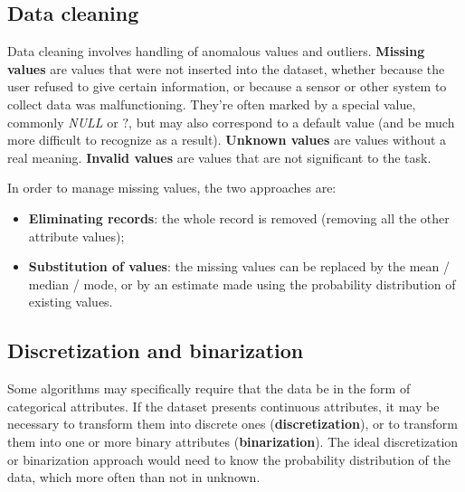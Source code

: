 \subsection{Data cleaning}

Data cleaning involves handling of anomalous values and outliers. \textbf{Missing values} are values that were not inserted into the dataset, whether because the user refused to give certain information, or because a sensor or other system to collect data was malfunctioning. They're often marked by a special value, commonly \textit{NULL} or $?$, but may also correspond to a default value (and be much more difficult to recognize as a result). \textbf{Unknown values} are values without a real meaning. \textbf{Invalid values} are values that are not significant to the task.

In order to manage missing values, the two approaches are:

\begin{itemize}
    \item \textbf{Eliminating records}: the whole record is removed (removing all the other attribute values);

    \item \textbf{Substitution of values}: the missing values can be replaced by the mean / median / mode, or by an estimate made using the probability distribution of existing values.
\end{itemize}

\subsection{Discretization and binarization}

Some algorithms may specifically require that the data be in the form of categorical attributes. If the dataset presents continuous attributes, it may be necessary to transform them into discrete ones (\textbf{discretization}), or to transform them into one or more binary attributes (\textbf{binarization}). The ideal discretization or binarization approach would need to know the probability distribution of the data, which more often than not in unknown.

